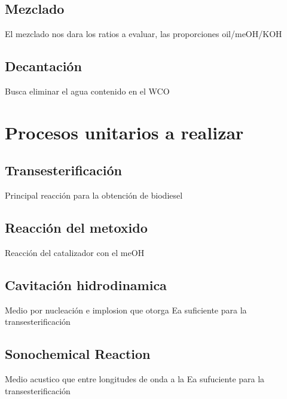 \documentclass[a4paper,10pt]{article}
\begin{document}
  \subsection{Mezclado}
  El mezclado nos dara los ratios a evaluar, las proporciones oil/meOH/KOH
  \subsection{Decantación}
  Busca eliminar el agua contenido en el WCO
\section{Procesos unitarios a realizar}
  \subsection{Transesterificación}
  Principal reacción para la obtención de biodiesel
  \subsection{Reacción del metoxido}
  Reacción del catalizador con el meOH
  \subsection{Cavitación hidrodinamica}
  Medio por nucleación e implosion que otorga Ea suficiente para la transesterificación
  \subsection{Sonochemical Reaction}
  Medio acustico que entre longitudes de onda a la Ea sufuciente para la transesterificación
\end{document}

